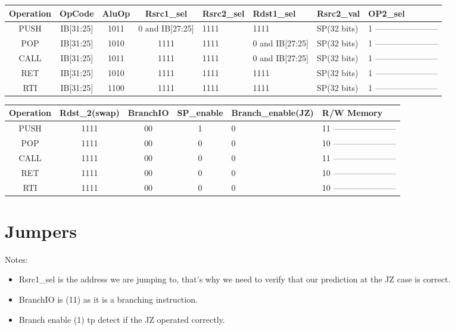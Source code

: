 \documentclass[12pt]{report}
\begin{document}
    \begin{center}
    \begin{tabular}{||c| c| c| c| p{40mm}||} 
    \hline
    Operation & OpCode & AluOp & Rsrc1_sel & Rsrc2_sel & Rdst1_sel & Rsrc2_val & OP2_sel  \\ [0.5ex] 
    \hline\hline
    PUSH & IB[31:25] & 1011 & 0 and IB[27:25] & 1111 & 1111 & SP(32 bits) & 1 ----------------------- \\
    \hline
    POP & IB[31:25] & 1010 & 1111 & 1111 & 0 and IB[27:25] & SP(32 bits) & 1 ----------------------- \\
    \hline
    CALL & IB[31:25] & 1011 & 1111 & 1111 & 0 and IB[27:25] & SP(32 bits) & 1 ----------------------- \\
    \hline
    RET & IB[31:25] & 1010 & 1111 & 1111 & 1111 & SP(32 bits) & 1 ----------------------- \\
    \hline
    RTI & IB[31:25] & 1100 & 1111 & 1111 & 1111 & SP(32 bits) & 1 ----------------------- \\
    \hline
    \end{tabular}
    \end{center}

    \begin{center}
    \begin{tabular}{||c| c| c| c| p{40mm}||} 
    \hline
    Operation & Rdst_2(swap) & BranchIO & SP_enable & Branch_enable(JZ) & R/W Memory  \\ [0.5ex] 
    \hline\hline
    PUSH & 1111 & 00 & 1 & 0 & 11 ----------------------- \\
    \hline
    POP & 1111 & 00 & 0 & 0 & 10 ----------------------- \\
    \hline
    CALL & 1111 & 00 & 0 & 0 & 11 ----------------------- \\
    \hline
    RET & 1111 & 00 & 0 & 0 & 10 ----------------------- \\
    \hline
    RTI & 1111 & 00 & 0 & 0 & 10 ----------------------- \\
    \hline
    \end{tabular}
    \end{center}


    \section{Jumpers}
    \item Notes:
    \begin{itemize}
        \item Rsrc1_sel is the address we are jumping to, that's why we need to verify that our prediction at the JZ case is correct.
        \item BranchIO is (11) as it is a branching instruction.
        \item Branch enable (1) tp detect if the JZ operated correctly.
    \end{itemize}
\end{document}
